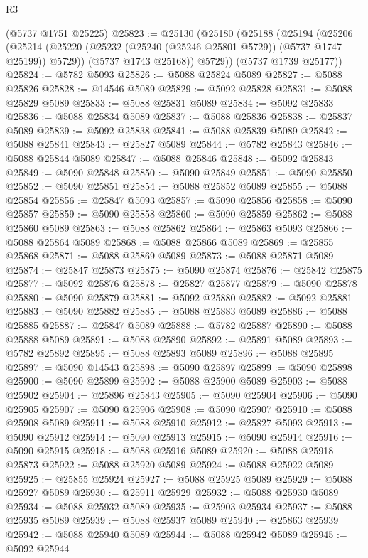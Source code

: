 \begin{lexlean}{R3}
\begin{coremodule}
    (@5737 @1751 @25225)
@25823 := @25130
    (@25180
      (@25188
        (@25194
          (@25206
            (@25214 (@25220 (@25232 (@25240 (@25246 @25801 @5729)) (@5737 @1747 @25199)) @5729))
            (@5737 @1743 @25168))
          @5729))
      (@5737 @1739 @25177))
@25824 := @5782 @5093
@25826 := @5088 @25824 @5089
@25827 := @5088 @25826
@25828 := @14546 @5089
@25829 := @5092 @25828
@25831 := @5088 @25829 @5089
@25833 := @5088 @25831 @5089
@25834 := @5092 @25833
@25836 := @5088 @25834 @5089
@25837 := @5088 @25836
@25838 := @25837 @5089
@25839 := @5092 @25838
@25841 := @5088 @25839 @5089
@25842 := @5088 @25841
@25843 := @25827 @5089
@25844 := @5782 @25843
@25846 := @5088 @25844 @5089
@25847 := @5088 @25846
@25848 := @5092 @25843
@25849 := @5090 @25848
@25850 := @5090 @25849
@25851 := @5090 @25850
@25852 := @5090 @25851
@25854 := @5088 @25852 @5089
@25855 := @5088 @25854
@25856 := @25847 @5093
@25857 := @5090 @25856
@25858 := @5090 @25857
@25859 := @5090 @25858
@25860 := @5090 @25859
@25862 := @5088 @25860 @5089
@25863 := @5088 @25862
@25864 := @25863 @5093
@25866 := @5088 @25864 @5089
@25868 := @5088 @25866 @5089
@25869 := @25855 @25868
@25871 := @5088 @25869 @5089
@25873 := @5088 @25871 @5089
@25874 := @25847 @25873
@25875 := @5090 @25874
@25876 := @25842 @25875
@25877 := @5092 @25876
@25878 := @25827 @25877
@25879 := @5090 @25878
@25880 := @5090 @25879
@25881 := @5092 @25880
@25882 := @5092 @25881
@25883 := @5090 @25882
@25885 := @5088 @25883 @5089
@25886 := @5088 @25885
@25887 := @25847 @5089
@25888 := @5782 @25887
@25890 := @5088 @25888 @5089
@25891 := @5088 @25890
@25892 := @25891 @5089
@25893 := @5782 @25892
@25895 := @5088 @25893 @5089
@25896 := @5088 @25895
@25897 := @5090 @14543
@25898 := @5090 @25897
@25899 := @5090 @25898
@25900 := @5090 @25899
@25902 := @5088 @25900 @5089
@25903 := @5088 @25902
@25904 := @25896 @25843
@25905 := @5090 @25904
@25906 := @5090 @25905
@25907 := @5090 @25906
@25908 := @5090 @25907
@25910 := @5088 @25908 @5089
@25911 := @5088 @25910
@25912 := @25827 @5093
@25913 := @5090 @25912
@25914 := @5090 @25913
@25915 := @5090 @25914
@25916 := @5090 @25915
@25918 := @5088 @25916 @5089
@25920 := @5088 @25918 @25873
@25922 := @5088 @25920 @5089
@25924 := @5088 @25922 @5089
@25925 := @25855 @25924
@25927 := @5088 @25925 @5089
@25929 := @5088 @25927 @5089
@25930 := @25911 @25929
@25932 := @5088 @25930 @5089
@25934 := @5088 @25932 @5089
@25935 := @25903 @25934
@25937 := @5088 @25935 @5089
@25939 := @5088 @25937 @5089
@25940 := @25863 @25939
@25942 := @5088 @25940 @5089
@25944 := @5088 @25942 @5089
@25945 := @5092 @25944

\end{coremodule}
\end{lexlean}
